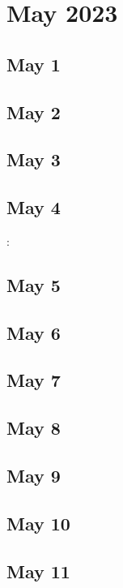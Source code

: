 %
%
%

\chapter{May 2023}
\label{intro} %

\section{May 1}

\section{May 2}

\section{May 3}

\section{May 4}
:
\section{May 5}

\section{May 6}

\section{May 7}

\section{May 8}

\section{May 9}

\section{May 10}

\section{May 11}

